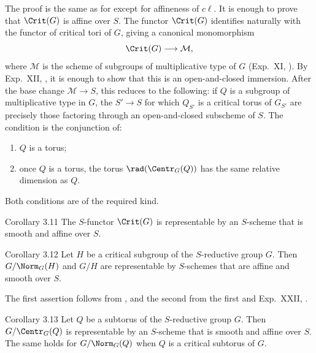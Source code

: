 The proof is the same as for  except for affineness of \(c\ell\).  It
is enough to prove that \(\Crit(G)\) is affine over \(S\).
The functor \(\Crit(G)\) identifies naturally with the functor of critical
tori of \(G\), giving a canonical monomorphism
\[
 \Crit(G)\longrightarrow\mathcal M,
\]
where \(\mathcal M\) is the scheme of subgroups of multiplicative type of
\(G\) (Exp.\ XI, ).  By Exp.\ XII, , it is enough to show that this
is an open-and-closed immersion.  After the base change
\(\mathcal M\to S\), this reduces to the following: if \(Q\) is a subgroup
of multiplicative type in \(G\), the \(S'\to S\) for which \(Q_{S'}\) is
a critical torus of \(G_{S'}\) are precisely those factoring through an
open-and-closed subscheme of \(S\).  The condition is the conjunction of:
\begin{enumerate}[label=\textup{(\arabic*)}]
\item \(Q\) is a torus;
\item once \(Q\) is a torus, the torus \(\rad(\Centr_G(Q))\) has the same
relative dimension as \(Q\).
\end{enumerate}
Both conditions are of the required kind.

\begin{sgastatement}{Corollary 3.11}
The \(S\)-functor \(\Crit(G)\) is representable by an \(S\)-scheme that
is smooth and affine over \(S\).
\end{sgastatement}

\begin{sgastatement}{Corollary 3.12}
Let \(H\) be a critical subgroup of the \(S\)-reductive group \(G\).
Then \(G/\Norm_G(H)\) and \(G/H\) are representable by \(S\)-schemes that
are affine and smooth over \(S\).
\end{sgastatement}

The first assertion follows from , and the second from the first and
Exp.\ XXII, .

\begin{sgastatement}{Corollary 3.13}
Let \(Q\) be a subtorus of the \(S\)-reductive group \(G\).  Then
\(G/\Centr_G(Q)\) is representable by an \(S\)-scheme that is smooth and
affine over \(S\).  The same holds for \(G/\Norm_G(Q)\) when \(Q\) is a
critical subtorus of \(G\).
\end{sgastatement}

